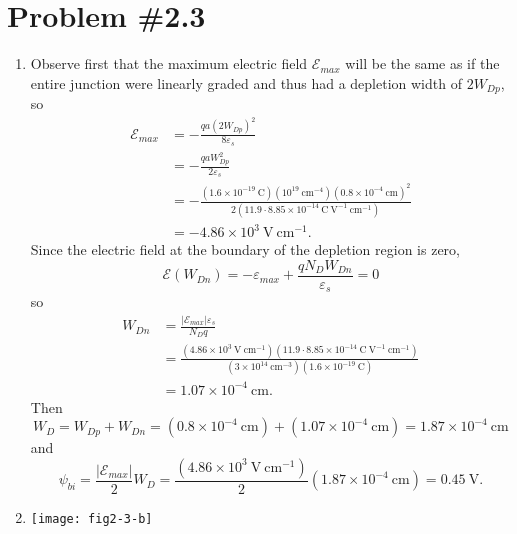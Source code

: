 \documentclass{article}
\begin{document}
\section*{Problem \#2.3}
\begin{enumerate}
  \item{
         Observe first that the maximum electric field $\mathscr{E}_{max}$ will
         be the same as if the entire junction were linearly graded and thus had
         a depletion width of $2 W_{Dp}$, so
         \begin{align*}
         \mathscr{E}_{max} &= -\frac{q a (2W_{Dp})^2}{8 \varepsilon_s} \\
                           &= -\frac{q a W_{Dp}^2}{2 \varepsilon_s} \\
                           &= -\frac{(1.6 \times 10^{-19} ~\mathrm{C})
                                     (10^{19} ~\mathrm{cm}^{-4})
                                     (0.8 \times 10^{-4} ~\mathrm{cm})^2}
                                    {2 (11.9 \cdot 8.85 \times 10^{-14} ~\mathrm{C}~\mathrm{V}^{-1}~\mathrm{cm}^{-1})} \\
                           &= -4.86 \times 10^{3} ~\mathrm{V}~\mathrm{cm}^{-1}.
         \end{align*}
         Since the electric field at the boundary of the depletion region 
         is zero,
         $$ 
         \mathscr{E}(W_{Dn}) = -\varepsilon_{max} + \frac{q N_D W_{Dn}}{\varepsilon_s} = 0
         $$
         so
         \begin{align*}
         W_{Dn} &= \frac{|\mathscr{E}_{max}| \varepsilon_s}{N_D q} \\
                &= \frac{(4.86 \times 10^{3}  ~\mathrm{V}~\mathrm{cm}^{-1})
                         (11.9 \cdot 8.85 \times 10^{-14} ~\mathrm{C}~\mathrm{V}^{-1}~\mathrm{cm}^{-1})}
                        {(3 \times 10^{14} ~\mathrm{cm}^{-3})
                         (1.6 \times 10^{-19} ~\mathrm{C})} \\
                &= 1.07 \times 10^{-4} ~\mathrm{cm}.
         \end{align*}
         Then
         $$
         W_{D} = W_{Dp} + W_{Dn} = (0.8 \times 10^{-4} ~\mathrm{cm}) +(1.07 \times 10^{-4} ~\mathrm{cm}) = 1.87 \times 10^{-4} ~\mathrm{cm}
         $$
         and
         $$
         \psi_{bi} = \frac{|\mathscr{E}_{max}|}{2} W_D = 
                     \frac{(4.86 \times 10^{3} ~\mathrm{V}~\mathrm{cm}^{-1})}{2}
                     (1.87 \times 10^{-4} ~\mathrm{cm}) = 0.45 ~\mathrm{V}.
         $$
       }
  \item{\texttt{[image: fig2-3-b]}}
\end{enumerate}
\end{document}
